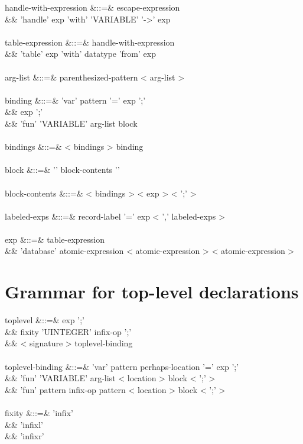 \documentclass[11pt,a4paper]{article}
\begin{document}
\begin{grammar}
handle-with-expression &::=& escape-expression \\
&&                          'handle' exp 'with' 'VARIABLE' '->' exp \\
\\
table-expression &::=&  handle-with-expression \\
&&                      'table' exp 'with' datatype 'from' exp \\
\\
arg-list &::=& parenthesized-pattern < arg-list >  \\
\\
binding &::=& 'var' pattern '=' exp ';' \\
&&            exp ';' \\
&&            'fun' 'VARIABLE' arg-list block \\
\\
bindings &::=& < bindings > binding \\
\\
block &::=& '{' block-contents '}' \\
\\
block-contents &::=& < bindings > < exp > < ';' >  \\
\\
labeled-exps &::=& record-label '=' exp < ',' labeled-exps > \\
\\
exp &::=& table-expression \\
&&        'database' atomic-expression < atomic-expression > < atomic-expression >  \\
\end{grammar} 

\section{Grammar for top-level declarations}

\begin{grammar}
toplevel &::=& exp ';' \\
&&             fixity 'UINTEGER' infix-op ';' \\
&&             < signature > toplevel-binding \\
\\
toplevel-binding &::=& 'var' pattern perhaps-location '=' exp ';' \\
&&                     'fun' 'VARIABLE' arg-list < location > block < ';' > \\
&&                     'fun' pattern infix-op pattern < location > block < ';' > \\
\\
fixity &::=& 'infix' \\
&&           'infixl' \\
&&           'infixr' \\
\end{grammar} 
 
\end{document}
